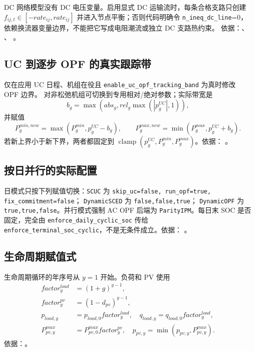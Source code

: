 DC 网络模型没有 DC 电压变量。启用显式 DC 运输流时，每条合格支路只创建
$f_{ij,t}\in[-rate_{ij},rate_{ij}]$ 并进入节点平衡；否则代码明确令
\texttt{n\_ineq\_dc\_line}=0，依赖换流器变量边界，不能把它写成电阻潮流或独立 DC 支路热约束。
依据：、
、
。

\subsection{UC 到逐步 OPF 的真实跟踪带}
仅在应用 UC 日程、机组在役且 \texttt{enable\_uc\_opf\_tracking\_band} 为真时修改 OPF 边界。
对非松弛机组可切换到专用相对/绝对参数；实际带宽是
\begin{equation}
 b_g=\max\left(abs_g,rel_g\max(|p_g^{UC}|,1)\right),
\end{equation}
并赋值
\begin{equation}
 P_g^{min,new}=\max(P_g^{min},p_g^{UC}-b_g),\qquad
 P_g^{max,new}=\min(P_g^{max},p_g^{UC}+b_g).
\end{equation}
若新上界小于新下界，两者都固定到
$\operatorname{clamp}(p_g^{UC},P_g^{min},P_g^{max})$。依据：
。

\subsection{按日并行的实际配置}
日模式只按下列赋值切换：\texttt{SCUC} 为
\texttt{skip\_uc=false, run\_opf=true, fix\_commitment=false}；
\texttt{DynamicSCED} 为 \texttt{false,false,true}；
\texttt{DynamicOPF} 为 \texttt{true,true,false}。并行模式强制 AC OPF 后端为
\texttt{ParityIPM}。每日末 SOC 是否固定，完全由
\texttt{enforce\_daily\_cyclic\_soc} 传给
\texttt{enforce\_terminal\_soc\_cyclic}，不是无条件成立。依据：
。

\subsection{生命周期赋值式}
生命周期循环的年序号从 $y=1$ 开始。负荷和 PV 使用
\begin{align}
 factor_y^{load}&=(1+g)^{y-1},\\
 factor_y^{pv}&=(1-d_{pv})^{y-1},\\
 p_{load,y}&=p_{load,0}factor_y^{load},\quad
 q_{load,y}=q_{load,0}factor_y^{load},\\
 P_{pv,y}^{max}&=P_{pv,0}^{max}factor_y^{pv},\quad
 p_{pv,y}=\min(p_{pv,y},P_{pv,y}^{max}).
\end{align}
依据：。

